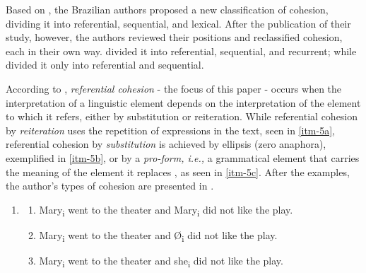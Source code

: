\documentclass{textolivre}
\begin{document}
Based on \textcite{halliday_cohesion_1976}, the Brazilian authors \textcite{favero_criterios_1985}
proposed a new classification of cohesion, dividing it into
referential, sequential, and lexical. After the publication of their
study, however, the authors reviewed their positions and reclassified
cohesion, each in their own way. \textcite{favero_coesao_2010} divided it into
referential, sequential, and recurrent; while \textcite{koch_coesao_2010} divided it
only into referential and sequential.

According to \textcite[p. 18-25]{favero_coesao_2010}, \emph{referential cohesion} - the
focus of this paper - occurs when the interpretation of a linguistic
element depends on the interpretation of the element to which it refers,
either by substitution or reiteration. While referential cohesion by
\emph{reiteration} uses the repetition of expressions in the text, seen
in \ref{itm-5a}, referential cohesion by \emph{substitution} is achieved by
ellipsis (zero anaphora), exemplified in \ref{itm-5b}, or by a \emph{pro-form,
i.e.,} a grammatical element that carries the meaning of the element it
replaces \cite[p. 19]{favero_coesao_2010}, as seen in \ref{itm-5c}. After the examples, the
author's types of cohesion are presented in .

%
%
\begin{enumerate}[wide,label=(\arabic*),topsep=1ex,partopsep=1ex,noitemsep,leftmargin=0.15cm,resume]
\setlength{\itemindent}{0em}
\item[]{} \addtocounter{enumi}{1}
\begin{enumerate}[wide,label=(\arabic{enumi}\alph*),topsep=1ex,partopsep=1ex,noitemsep]
\setlength{\itemindent}{0em}
\item \label{itm-5a} Mary\textsubscript{i} went to the theater and Mary\textsubscript{i} did not like the play.
\item \label{itm-5b} Mary\textsubscript{i} went to the theater and Ø\textsubscript{i} did not like the play.
\item \label{itm-5c} Mary\textsubscript{i} went to the theater and she\textsubscript{i} did not like the play.
\end{enumerate}
\end{enumerate}
\end{document}
